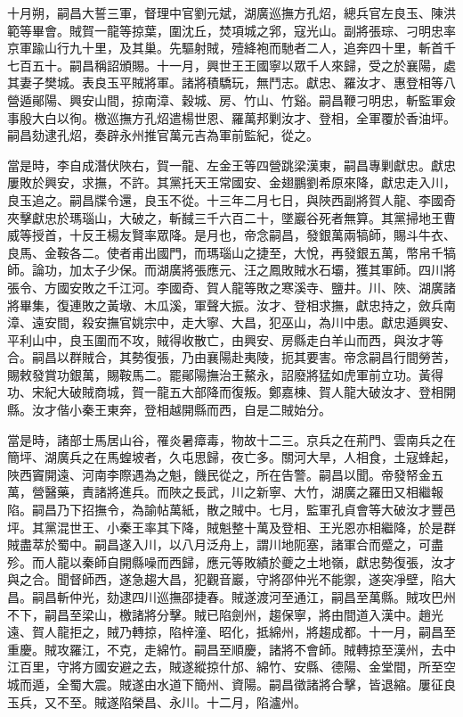 \begin{pinyinscope}
十月朔，嗣昌大誓三軍，督理中官劉元斌，湖廣巡撫方孔炤，總兵官左良玉、陳洪範等畢會。賊賀一龍等掠葉，圍沈丘，焚項城之郛，寇光山。副將張琮、刁明忠率京軍踰山行九十里，及其巢。先驅射賊，殪絳袍而馳者二人，追奔四十里，斬首千七百五十。嗣昌稱詔頒賜。十一月，興世王王國寧以眾千人來歸，受之於襄陽，處其妻子樊城。表良玉平賊將軍。諸將積驕玩，無鬥志。獻忠、羅汝才、惠登相等八營遁鄖陽、興安山間，掠南漳、穀城、房、竹山、竹谿。嗣昌鞭刁明忠，斬監軍僉事殷大白以徇。檄巡撫方孔炤遣楊世恩、羅萬邦剿汝才、登相，全軍覆於香油坪。嗣昌劾逮孔炤，奏辟永州推官萬元吉為軍前監紀，從之。

當是時，李自成潛伏陜右，賀一龍、左金王等四營跳梁漢東，嗣昌專剿獻忠。獻忠屢敗於興安，求撫，不許。其黨托天王常國安、金翅鵬劉希原來降，獻忠走入川，良玉追之。嗣昌牒令還，良玉不從。十三年二月七日，與陜西副將賀人龍、李國奇夾擊獻忠於瑪瑙山，大破之，斬馘三千六百二十，墜巖谷死者無算。其黨掃地王曹威等授首，十反王楊友賢率眾降。是月也，帝念嗣昌，發銀萬兩犒師，賜斗牛衣、良馬、金鞍各二。使者甫出國門，而瑪瑙山之捷至，大悅，再發銀五萬，幣帛千犒師。論功，加太子少保。而湖廣將張應元、汪之鳳敗賊水石壩，獲其軍師。四川將張令、方國安敗之千江河。李國奇、賀人龍等敗之寒溪寺、鹽井。川、陜、湖廣諸將畢集，復連敗之黃墩、木瓜溪，軍聲大振。汝才、登相求撫，獻忠持之，斂兵南漳、遠安間，殺安撫官姚宗中，走大寧、大昌，犯巫山，為川中患。獻忠遁興安、平利山中，良玉圍而不攻，賊得收散亡，由興安、房縣走白羊山而西，與汝才等合。嗣昌以群賊合，其勢復張，乃由襄陽赴夷陵，扼其要害。帝念嗣昌行間勞苦，賜敕發賞功銀萬，賜鞍馬二。罷鄖陽撫治王鰲永，詔廢將猛如虎軍前立功。黃得功、宋紀大破賊商城，賀一龍五大部降而復叛。鄭嘉棟、賀人龍大破汝才、登相開縣。汝才偕小秦王東奔，登相越開縣而西，自是二賊始分。

當是時，諸部士馬居山谷，罹炎暑瘴毒，物故十二三。京兵之在荊門、雲南兵之在簡坪、湖廣兵之在馬蝗坡者，久屯思歸，夜亡多。關河大旱，人相食，土寇蜂起，陜西竇開遠、河南李際遇為之魁，饑民從之，所在告警。嗣昌以聞。帝發帑金五萬，營醫藥，責諸將進兵。而陜之長武，川之新寧、大竹，湖廣之羅田又相繼報陷。嗣昌乃下招撫令，為諭帖萬紙，散之賊中。七月，監軍孔貞會等大破汝才豐邑坪。其黨混世王、小秦王率其下降，賊魁整十萬及登相、王光恩亦相繼降，於是群賊盡萃於蜀中。嗣昌遂入川，以八月泛舟上，謂川地阨塞，諸軍合而蹙之，可盡殄。而人龍以秦師自開縣噪而西歸，應元等敗績於夔之土地嶺，獻忠勢復張，汝才與之合。聞督師西，遂急趨大昌，犯觀音巖，守將邵仲光不能禦，遂突凈壁，陷大昌。嗣昌斬仲光，劾逮四川巡撫邵捷春。賊遂渡河至通江，嗣昌至萬縣。賊攻巴州不下，嗣昌至梁山，檄諸將分擊。賊已陷劍州，趨保寧，將由間道入漢中。趙光遠、賀人龍拒之，賊乃轉掠，陷梓潼、昭化，抵綿州，將趨成都。十一月，嗣昌至重慶。賊攻羅江，不克，走綿竹。嗣昌至順慶，諸將不會師。賊轉掠至漢州，去中江百里，守將方國安避之去，賊遂縱掠什邡、綿竹、安縣、德陽、金堂間，所至空城而遁，全蜀大震。賊遂由水道下簡州、資陽。嗣昌徵諸將合擊，皆退縮。屢征良玉兵，又不至。賊遂陷榮昌、永川。十二月，陷瀘州。


\end{pinyinscope}
